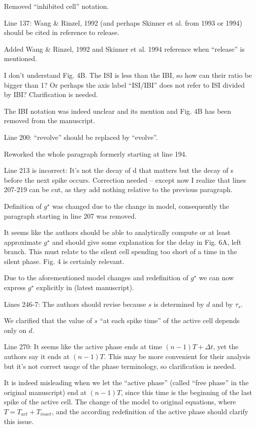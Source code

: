 \documentclass{ar2rc}
\begin{document}
\AR
Removed ``inhibited cell'' notation.

\RC
Line 137: Wang \& Rinzel, 1992 (and perhaps Skinner et al. from 1993 or 1994) should be cited in reference to release.

\AR
Added Wang \& Rinzel, 1992 and Skinner et al. 1994 reference when ``release'' is mentioned.

\RC
I don’t understand Fig. 4B. The ISI is less than the IBI, so how can their ratio be bigger than 1? Or perhaps the axis label “ISI/IBI” does not refer to ISI divided by IBI? Clarification is needed.

\AR
The IBI notation was indeed unclear and its mention and Fig. 4B has been removed from the manuscript.

\RC
Line 200: “revolve” should be replaced by “evolve”.

\AR
Reworked the whole paragraph formerly starting at line 194.

\RC
Line 213 is incorrect: It’s not the decay of d that matters but the decay of s before the next spike occurs. Correction needed – except now I realize that lines 207-219 can be cut, as they add nothing relative to the previous paragraph.

\AR
Definition of $g^{\star}$ was changed due to the change in model, consequently the paragraph starting in line 207 was removed.

\RC
It seems like the authors should be able to analytically compute or at least approximate $g^\star$ and should give some explanation for the delay in Fig. 6A, left branch. This must relate to the silent cell spending too short of a time in the silent phase. Fig. 4 is certainly relevant.

\AR
Due to the aforementioned model changes and redefinition of $g^\star$ we can now express $g^{\star}$ explicitly in  (latest manuscript).

\RC
Lines 246-7: The authors should revise because $s$ is determined by $d$ and by $\tau_s$.

\AR
We clarified that the value of $s$ ``at each spike time'' of the active cell depends only on $d$.

\RC
Line 270: It seems like the active phase ends at time $(n-1)T+\Delta t$, yet the authors say it ends at $(n-1)T$. This may be more convenient for their analysis but it’s not correct usage of the phase terminology, so clarification is needed.

\AR
It is indeed misleading when we let the ``active phase'' (called ``free phase'' in the original manuscript) end at $(n-1)T$, since this time is the beginning of the last spike of the active cell.
The change of the model to \citet{bose2011} original equations, where $T=T_{act}+T_{inact}$, and the according redefinition of the active phase should clarify this issue.
\end{document}
